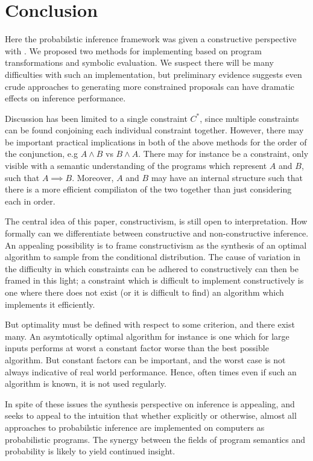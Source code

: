 \section{Conclusion}
Here the probabilstic inference framework  was given a constructive perspective with .
We proposed two methods for implementing  based on program transformations and symbolic evaluation.
We suspect there will be many difficulties with such an implementation, but preliminary evidence suggests even crude approaches to generating more constrained proposals can have dramatic effects on inference performance.

Discussion has been limited to a single constraint $C^*$, since multiple constraints can be found conjoining each individual constraint together.
However, there may be important practical implications in both of the above methods for the order of the conjunction, e.g $A \land B$ vs $B \land A$.
There may for instance be a constraint, only visible with a semantic understanding of the programs which represent $A$ and $B$, such that $A \implies B$.
Moreover, $A$ and $B$ may have an internal structure such that there is a more efficient compiliaton of the two together than just considering each in order.

The central idea of this paper, constructivism, is still open to interpretation.
How formally can we differentiate between constructive and non-constructive inference.
An appealing possibility is to frame constructivism as the synthesis of an optimal algorithm to sample from the conditional distribution.
The cause of variation in the difficulty in which constraints can be adhered to constructively can then be framed in this light; a constraint which is difficult to implement constructively is one where there does not exist (or it is difficult to find) an algorithm which implements it efficiently.

But optimality must be defined with respect to some criterion, and there exist many.
An asymtotically optimal algorithm for instance is one which for large inputs performs at worst a constant factor worse than the best possible algorithm.
But constant factors can be important, and the worst case is not always indicative of real world performance.
Hence, often times even if such an algorithm is known, it is not used regularly.

In spite of these issues the synthesis perspective on inference is appealing, and seeks to appeal to the intuition that whether explicitly or otherwise, almost all approaches to probabilstic inference are implemented on computers as probabilistic programs.
The synergy between the fields of program semantics and probability is likely to yield continued insight.

